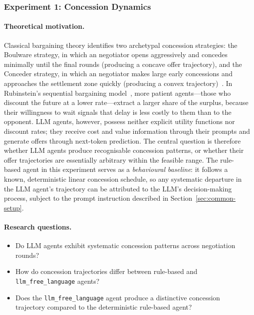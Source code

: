 \subsubsection{Experiment 1: Concession Dynamics}
\label{sec:exp-concession}

\paragraph{Theoretical motivation.}
Classical bargaining theory identifies two archetypal concession strategies: the Boulware strategy, in which an negotiator opens aggressively and concedes minimally until the final rounds (producing a concave offer trajectory), and the Conceder strategy, in which an negotiator makes large early concessions and approaches the settlement zone quickly (producing a convex trajectory)~\cite{raiffa1982}.  In Rubinstein's sequential bargaining model~\cite{rubinstein1982}, more patient agents---those who discount the future at a lower rate---extract a larger share of the surplus, because their willingness to wait signals that delay is less costly to them than to the opponent.  LLM agents, however, possess neither explicit utility functions nor discount rates; they receive cost and value information through their prompts and generate offers through next-token prediction.  The central question is therefore whether LLM agents produce recognisable concession patterns, or whether their offer trajectories are essentially arbitrary within the feasible range.  The rule-based agent in this experiment serves as a \emph{behavioural baseline}: it follows a known, deterministic linear concession schedule, so any systematic departure in the LLM agent's trajectory can be attributed to the LLM's decision-making process, subject to the prompt instruction described in Section~\ref{sec:common-setup}.

\paragraph{Research questions.}
\begin{itemize}
    \item[\textbf{RQ-11.}] Do LLM agents exhibit systematic concession patterns across negotiation rounds?
    \item[\textbf{RQ-12.}] How do concession trajectories differ between rule-based and \texttt{llm\_free\_language} agents?
    \item[\textbf{RQ-13.}] Does the \texttt{llm\_free\_language} agent produce a distinctive concession trajectory compared to the deterministic rule-based agent?
\end{itemize}

